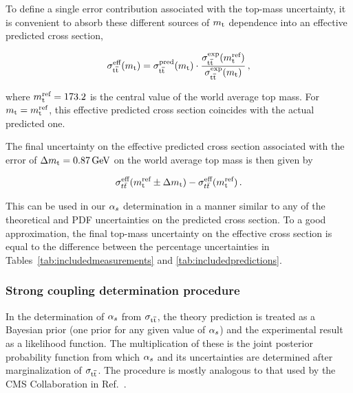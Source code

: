 To define a single error contribution associated with the
top-mass uncertainty, it is convenient to absorb these different
sources of $m_{\mathrm{t}}$ dependence into an effective predicted cross section,
\begin{linenomath*}
\begin{equation}
  \label{eq:eff-mtop-dep}
\sigma_{\mathrm{t}\overline{\mathrm{t}}}^{\text{eff}}(m_{\mathrm{t}}) = 
    \sigma_{\mathrm{t}\overline{\mathrm{t}}}^{\text{pred}} (  m_{\mathrm{t}}  ) \cdot 
        \frac{
            \sigma_{\mathrm{t}\overline{\mathrm{t}}}^{\text{exp}} (  m_{\mathrm{t}}^{\text{ref}}  )
            }{
            \sigma_{\mathrm{t}\overline{\mathrm{t}}}^{\text{exp}} (  m_{\mathrm{t}}  )
            }\,,
\end{equation}
\end{linenomath*}
where $m_{\mathrm{t}}^{\text{ref}} = 173.2$ is the central value of the world average top
mass.
%
For $m_{\mathrm{t}} = m_{\mathrm{t}}^{\text{ref}}$, this effective predicted cross section coincides
with the actual predicted one.

The final uncertainty on the effective predicted cross section
associated with the error of $\Delta m_{\mathrm{t}} = 0.87\,\text{GeV}$ on the world
average top mass is then given by
\begin{linenomath*}
\begin{equation}
  \label{eq:mtop-uncertainty-impact}
  \sigma_{t\bar{t}}^{\text{eff}}(m_{\mathrm{t}}^{\text{ref}} \pm \Delta m_{\mathrm{t}}) - 
  \sigma_{t\bar{t}}^{\text{eff}}(m_{\mathrm{t}}^{\text{ref}})\,.
\end{equation}
\end{linenomath*}
This can be used in our $\alpha_s$ determination in a manner similar to
any of the theoretical and PDF uncertainties on the predicted cross
section.
% 
To a good approximation, the final top-mass uncertainty on the
effective cross section is equal to the difference between the
percentage uncertainties in Tables~\ref{tab:includedmeasurements} and
\ref{tab:includedpredictions}.
%

\subsubsection{Strong coupling determination procedure}
\label{sec:determination-procedure}

In the determination of $\alpha_s$ from $\sigma_{\mathrm{t}\overline{\mathrm{t}}}$, the theory prediction is
treated as a Bayesian prior (one prior for any given value of $\alpha_s$)
and the experimental result as a likelihood function.  The
multiplication of these is the joint posterior probability function
from which $\alpha_s$ and its uncertainties are determined after
marginalization of $\sigma_{\mathrm{t}\overline{\mathrm{t}}}$.  The procedure is mostly analogous to that
used by the CMS Collaboration in Ref.~\cite{Chatrchyan:2013haa}.

